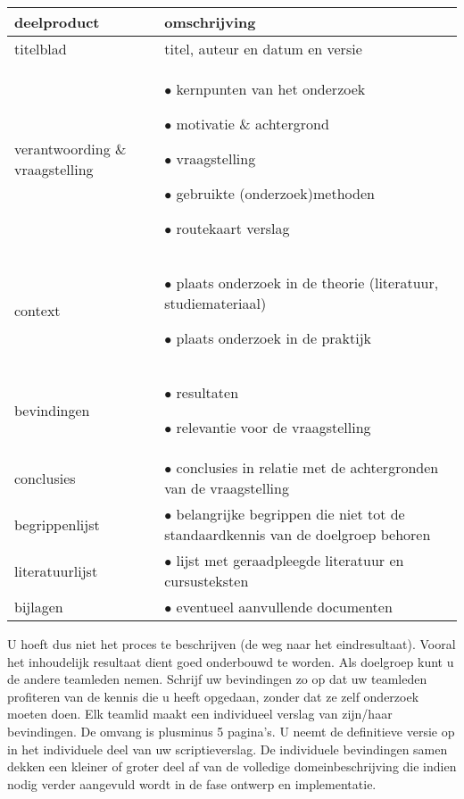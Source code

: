\begin{center}
\begin{tabular}{|l|p{30em}|}
\hline
{\bf deelproduct} & {\bf omschrijving}
\\\hline
titelblad & titel, auteur en datum en versie
\\\hline
verantwoording \& vraagstelling &
    \par $\bullet$ kernpunten van het onderzoek
    \par $\bullet$ motivatie \& achtergrond
    \par $\bullet$ vraagstelling
    \par $\bullet$ gebruikte (onderzoek)methoden
    \par $\bullet$ routekaart verslag
\\\hline
context &
    \par $\bullet$ plaats onderzoek in de theorie (literatuur, studiemateriaal)
    \par $\bullet$ plaats onderzoek in de praktijk
\\\hline
bevindingen &
    \par $\bullet$ resultaten
    \par $\bullet$ relevantie voor de vraagstelling
\\\hline
conclusies &
    \par $\bullet$ conclusies in relatie met de achtergronden van de vraagstelling
\\\hline
begrippenlijst &
    \par $\bullet$ belangrijke begrippen die niet tot de standaardkennis van de doelgroep
behoren
\\\hline
literatuurlijst &
    \par $\bullet$ lijst met geraadpleegde literatuur en cursusteksten
\\\hline
bijlagen &
    \par $\bullet$ eventueel aanvullende documenten
\\\hline
\end{tabular}
\end{center}

U hoeft dus niet het proces te beschrijven (de weg naar het eindresultaat).
Vooral het inhoudelijk resultaat dient goed onderbouwd te worden.
Als doelgroep kunt u de andere teamleden nemen. Schrijf uw bevindingen zo op dat
uw teamleden profiteren van de kennis die u heeft opgedaan, zonder dat ze zelf
onderzoek moeten doen.
Elk teamlid maakt een individueel verslag van zijn/haar bevindingen. De omvang
is plusminus  5 pagina's.
U neemt de definitieve versie op in het individuele deel van uw scriptieverslag.
De individuele bevindingen samen dekken een kleiner of groter deel af van de
volledige domeinbeschrijving die indien nodig verder aangevuld wordt in de fase
ontwerp en implementatie.

